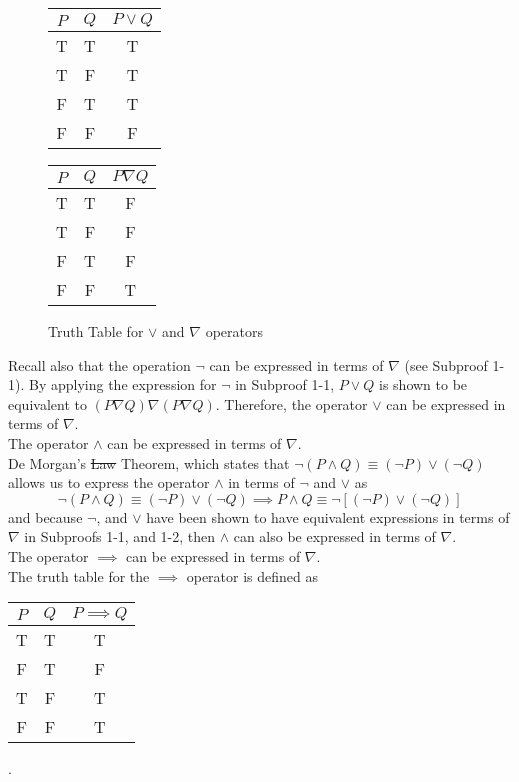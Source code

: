 \documentclass{article}
\begin{document}
\begin{figure}[h]
\centering
\begin{tabular}{c|c|c}
	$P$ & $Q$ & $P \vee Q$ \\ \hline 
	T   & T   & T \\
	T   & F   & T \\
	F   & T   & T \\
	F   & F   & F \\
\end{tabular} \hspace{0.5in}
\begin{tabular}{c|c|c}
	$P$ & $Q$ & $P \nabla Q$ \\ \hline 
	T   & T   & F \\
	T   & F   & F \\
	F   & T   & F \\
	F   & F   & T \\
\end{tabular} \hspace{0.5in}
\caption{Truth Table for $\vee$ and $\nabla$ operators}
\label{table:truthVeeAndNabla}
\end{figure}
Recall also that the operation $\neg$ can be expressed in terms of $\nabla$ (see Subproof 1-1). By applying the expression for $\neg$ in Subproof 1-1, $P\vee Q$ is shown to be equivalent to $(P\nabla Q)\nabla (P\nabla Q)$. Therefore, the operator $\vee$ can be expressed in terms of $\nabla$.
\\[0.1in] The operator $\wedge$ can be expressed in terms of $\nabla$.
\\[0.05in] De Morgan's \sout{Law} Theorem, which states that $\neg (P\wedge Q) \equiv (\neg P)\vee(\neg Q)$ allows us to express the operator $\wedge$ in terms of $\neg$ and $\vee$ as
\begin{equation*}
	\neg (P\wedge Q) \equiv (\neg P)\vee(\neg Q) \implies P\wedge Q \equiv \neg \left [ (\neg P) \vee (\neg Q) \right ]
\end{equation*}
and because $\neg$, and $\vee$ have been shown to have equivalent expressions in terms of $\nabla$ in Subproofs 1-1, and 1-2, then $\wedge$ can also be expressed in terms of $\nabla$. 
\pagebreak
\\[0.1in] The operator $\implies$ can be expressed in terms of $\nabla$.
\\[0.05in] The truth table for the $\implies$ operator is defined as
\begin{center}
	\begin{tabular}{c|c|c}
		$P$ & $Q$ & $P \implies Q$ \\ \hline
		T   & T   & T \\
		F   & T   & F \\
		T   & F   & T \\
		F   & F   & T \\
	\end{tabular}.
\end{center}
\end{document}
